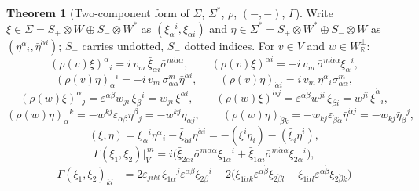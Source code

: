 \documentclass[11pt]{article}
\theoremstyle{definition}
\newtheorem{theorem}[definition]{Theorem}
\begin{document}
\begin{theorem}[Two-component form of $\Sigma$, $\Sigma^*$, $\rho$, $(-,-)$, $\Gamma$]\label{thm:real}
Write $\xi\in\Sigma=S_+\otimes W\oplus S_-\otimes W^*$ as $(\xi_\alpha{}^i,\bar\xi_{\dot\alpha i})$ and $\eta\in\Sigma^*=S_+\otimes W^*\oplus S_-\otimes W$ as $(\eta^\alpha{}_i,\bar\eta^{\dot\alpha i})$; $S_+$ carries undotted, $S_-$ dotted indices. For $v\in V$ and $w\in W_{\mathbb R}^\perp$:
\begin{equation}\tag{R1}
(\rho(v)\xi)^\alpha{}_i=i\,v_m\,\bar\xi_{\dot\alpha i}\bar\sigma^{m\dot\alpha\alpha},\qquad (\rho(v)\xi)^{\dot\alpha i}=-i\,v_m\,\bar\sigma^{m\dot\alpha\alpha}\xi_\alpha{}^i,
\end{equation}
\begin{equation}\tag{R2}
(\rho(v)\eta)_\alpha{}^i=-i\,v_m\,\sigma^m_{\alpha\dot\alpha}\bar\eta^{\dot\alpha i},\qquad (\rho(v)\eta)_{\dot\alpha i}=i\,v_m\,\eta^\alpha{}_i\sigma^m_{\alpha\dot\alpha},
\end{equation}
\begin{equation}\tag{R3}
(\rho(w)\xi)^\alpha{}_j=\varepsilon^{\alpha\beta}w_{ji}\,\xi_\beta{}^i=w_{ji}\,\xi^{\alpha i},\qquad (\rho(w)\xi)^{\dot\alpha j}=\varepsilon^{\dot\alpha\dot\beta}w^{ji}\,\bar\xi_{\dot\beta i}=w^{ji}\,\bar\xi^{\dot\alpha}{}_i,
\end{equation}
\begin{equation}\tag{R4}
(\rho(w)\eta)_\alpha{}^k=-w^{kj}\varepsilon_{\alpha\beta}\eta^\beta{}_j=-w^{kj}\eta_{\alpha j},\qquad (\rho(w)\eta)_{\dot\beta k}=-w_{kj}\varepsilon_{\dot\beta\dot\alpha}\bar\eta^{\dot\alpha j}=-w_{kj}\bar\eta_{\dot\beta}{}^j,
\end{equation}
\begin{equation}\tag{P1}
(\xi,\eta)=\xi_\alpha{}^i\eta^\alpha{}_i-\bar\xi_{\dot\alpha i}\bar\eta^{\dot\alpha i}=-(\xi^i\eta_i)-(\bar\xi_i\bar\eta^i),
\end{equation}
\begin{equation}\tag{G1}
\Gamma(\xi_1,\xi_2)\big|_V^{\,m}=i\big(\bar\xi_{2\dot\alpha i}\bar\sigma^{m\dot\alpha\alpha}\xi_{1\alpha}{}^i+\bar\xi_{1\dot\alpha i}\bar\sigma^{m\dot\alpha\alpha}\xi_{2\alpha}{}^i\big),
\end{equation}
\begin{equation}\tag{G2}
\begin{aligned}\Gamma(\xi_1,\xi_2)_{kl}&=2\varepsilon_{jikl}\,\xi_{1\alpha}{}^j\varepsilon^{\alpha\beta}\xi_{2\beta}{}^i-2\big(\bar\xi_{1\dot\alpha k}\varepsilon^{\dot\alpha\dot\beta}\bar\xi_{2\dot\beta l}-\bar\xi_{1\dot\alpha l}\varepsilon^{\dot\alpha\dot\beta}\bar\xi_{2\dot\beta k}\big)\\

\end{aligned}
\end{equation}
\end{theorem}
\end{document}
